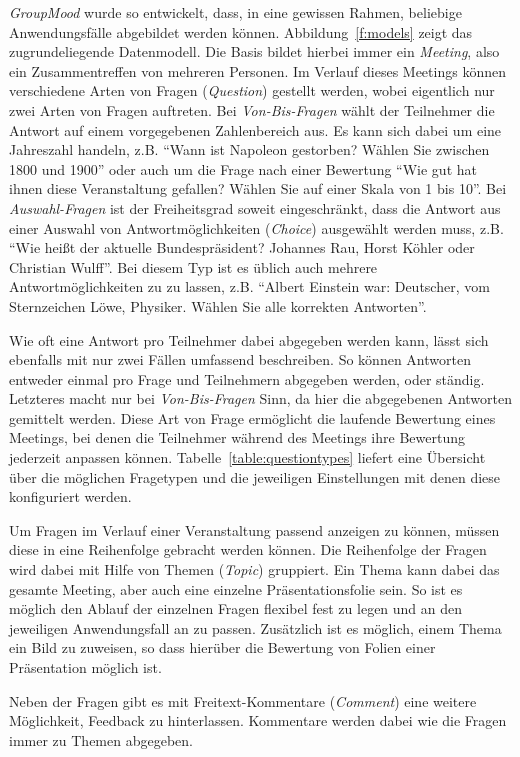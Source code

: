 \emph{GroupMood} wurde so entwickelt, dass, in eine gewissen Rahmen, beliebige Anwendungsfälle abgebildet werden können. Abbildung~\ref{f:models} zeigt das zugrundeliegende Datenmodell. Die Basis bildet hierbei immer ein \emph{Meeting}, also ein Zusammentreffen von mehreren Personen. Im Verlauf dieses Meetings können verschiedene Arten von Fragen (\emph{Question}) gestellt werden, wobei eigentlich nur zwei Arten von Fragen auftreten. Bei \emph{Von-Bis-Fragen} wählt der Teilnehmer die Antwort auf einem vorgegebenen Zahlenbereich aus. Es kann sich dabei um eine Jahreszahl handeln, z.B. "`Wann ist Napoleon gestorben? Wählen Sie zwischen 1800 und 1900"' oder auch um die Frage nach einer Bewertung "`Wie gut hat ihnen diese Veranstaltung gefallen? Wählen Sie auf einer Skala von 1 bis 10"'. Bei \emph{Auswahl-Fragen} ist der Freiheitsgrad soweit eingeschränkt, dass die Antwort aus einer Auswahl von Antwortmöglichkeiten (\emph{Choice}) ausgewählt werden muss, z.B. "`Wie heißt der aktuelle Bundespräsident? Johannes Rau, Horst Köhler oder Christian Wulff"'. Bei diesem Typ ist es üblich auch mehrere Antwortmöglichkeiten zu zu lassen, z.B. "`Albert Einstein war: Deutscher, vom Sternzeichen Löwe, Physiker. Wählen Sie alle korrekten Antworten"'.

Wie oft eine Antwort pro Teilnehmer dabei abgegeben werden kann, lässt sich ebenfalls mit nur zwei Fällen umfassend beschreiben. So können Antworten entweder einmal pro Frage und Teilnehmern abgegeben werden, oder ständig. Letzteres macht nur bei \emph{Von-Bis-Fragen} Sinn, da hier die abgegebenen Antworten gemittelt werden. Diese Art von Frage ermöglicht die laufende Bewertung eines Meetings, bei denen die Teilnehmer während des Meetings ihre Bewertung jederzeit anpassen können. Tabelle~\ref{table:questiontypes} liefert eine Übersicht über die möglichen Fragetypen und die jeweiligen Einstellungen mit denen diese konfiguriert werden.

Um Fragen im Verlauf einer Veranstaltung passend anzeigen zu können, müssen diese in eine Reihenfolge gebracht werden können. Die Reihenfolge der Fragen wird dabei mit Hilfe von Themen (\emph{Topic}) gruppiert. Ein Thema kann dabei das gesamte Meeting, aber auch eine einzelne Präsentationsfolie sein. So ist es möglich den Ablauf der einzelnen Fragen flexibel fest zu legen und an den jeweiligen Anwendungsfall an zu passen. Zusätzlich ist es möglich, einem Thema ein Bild zu zuweisen, so dass hierüber die Bewertung von Folien einer Präsentation möglich ist.

Neben der Fragen gibt es mit Freitext-Kommentare (\emph{Comment}) eine weitere Möglichkeit, Feedback zu hinterlassen. Kommentare werden dabei wie die Fragen immer zu Themen abgegeben.

